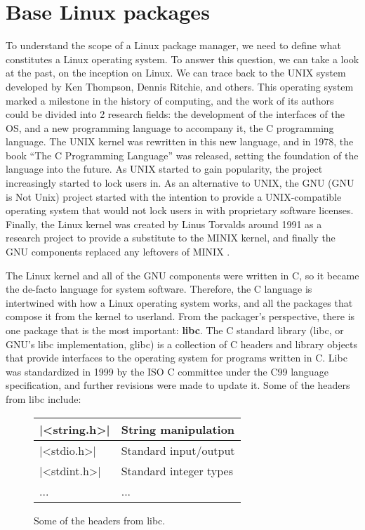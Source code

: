 \FloatBarrier
\section{Base Linux packages}

To understand the scope of a Linux package manager, we need
to define what constitutes a Linux operating system. To
answer this question, we can take a look at the past, on the
inception on Linux. We can trace back to the UNIX system
\cite{ritchieUNIXSystemEvolution1984} developed by Ken
Thompson, Dennis Ritchie, and others. This operating system
marked a milestone in the history of computing, and the work
of its authors could be divided into 2 research fields: the
development of the interfaces of the OS, and a new
programming language to accompany it, the C programming
language. The UNIX kernel was rewritten in this new
language, and in 1978, the book
``The C Programming Language''
\cite{ritchieProgrammingLanguage1983} was
released, setting the foundation of the language into the
future. As UNIX started to gain popularity, the project
increasingly started to lock users in. As an alternative to
UNIX, the GNU (GNU is Not Unix) project started with the
intention to provide a UNIX-compatible operating system that
would not lock users in with proprietary software licenses.
Finally, the Linux kernel was created by Linus Torvalds
around 1991 as a research project to provide a substitute to
the MINIX kernel, and finally the GNU components replaced
any leftovers of MINIX \cite{OverviewGNUSystem}.

The Linux kernel and all of the GNU components were written
in C, so it became the de-facto language for system
software. Therefore, the C language is intertwined with how
a Linux operating system works, and all the packages that
compose it from the kernel to userland. From the packager's
perspective, there is one package that is the most
important: \textbf{libc}. The C standard library (libc, or
GNU's libc implementation, glibc) is a collection of C
headers and library objects that provide interfaces to the
operating system for programs written in C. Libc was
standardized in 1999 by the ISO C committee under the C99
language specification, and further revisions were made to
update it. Some of the headers from libc include:

\begin{figure}[hbt]
    \centerfloat
    \begin{tabular}{ll}
        \hline
        |<string.h>| & String manipulation \\
        \hline
        |<stdio.h>| & Standard input/output \\
        \hline
        |<stdint.h>| & Standard integer types \\
        \hline
        ... & ... \\
        \hline
    \end{tabular}
    \caption{Some of the headers from libc.}
\end{figure}

